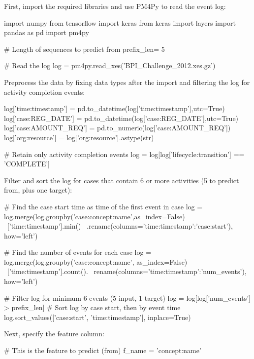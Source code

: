 \begin{withcode}
First, import the required libraries and use PM4Py to read the event log:

\begin{pythoncode}
import numpy
from tensorflow import keras
from keras import layers
import pandas as pd
import pm4py

# Length of sequences to predict from
prefix_len= 5   

# Read the log
log = pm4py.read_xes('BPI_Challenge_2012.xes.gz')  
\end{pythoncode}

Preprocess the data by fixing data types after the import and filtering the log for activity completion events:

\begin{pythoncode}
log['time:timestamp'] = pd.to_datetime(log['time:timestamp'],utc=True)
log['case:REG_DATE'] = pd.to_datetime(log['case:REG_DATE'],utc=True)
log['case:AMOUNT_REQ'] = pd.to_numeric(log['case:AMOUNT_REQ'])
log['org:resource'] = log['org:resource'].astype(str)

# Retain only activity completion events
log = log[log['lifecycle:transition'] == 'COMPLETE']
\end{pythoncode}

Filter and sort the log for cases that contain 6 or more activities (5 to predict from, plus one target):

\begin{pythoncode}
# Find the case start time as time of the first event in case
log = log.merge(log.groupby('case:concept:name',as_index=False) \
    ['time:timestamp'].min() \
    .rename(columns={'time:timestamp':'case:start'}), how='left')
    
# Find the number of events for each case
log = log.merge(log.groupby('case:concept:name', as_index=False) \
    ['time:timestamp'].count(). \
    rename(columns={'time:timestamp':'num_events'}), how='left')
    
# Filter log for minimum 6 events (5 input, 1 target)
log = log[log['num_events'] > prefix_len]
# Sort log by case start, then by event time
log.sort_values(['case:start', 'time:timestamp'], inplace=True)
\end{pythoncode}

Next, specify the feature column:

\begin{pythoncode}
# This is the feature to predict (from)
f_name = 'concept:name'
\end{pythoncode}


\end{withcode}
